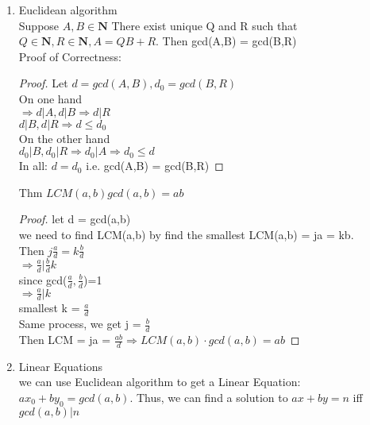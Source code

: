 \documentclass[10pt]{article}
\newcommand{\Nb}{\mathbf{N}}
\begin{document}
\begin{multicols}{2}
\begin{enumerate}
	\item Euclidean algorithm\\
	Suppose $A,B\in \Nb$ There exist unique Q and R such that $Q\in \Nb, R\in \Nb, A = QB+R$. Then gcd(A,B) = gcd(B,R)\\
	Proof of Correctness: 
	\begin{proof}
		Let $d = gcd(A,B), d_0 = gcd(B,R)$\\
		On one hand\\
		$\Rightarrow d|A, d|B \Rightarrow d|R$\\
		$d|B, d|R \Rightarrow d \le d_0$\\
		On the other hand\\
		$d_0|B, d_0|R \Rightarrow d_0 |A \Rightarrow d_0 \le d$\\
		In all: $d = d_0$ i.e. gcd(A,B) = gcd(B,R)
	\end{proof} 

    Thm $LCM(a,b)gcd(a,b) = ab$
	\begin{proof}
		let d = gcd(a,b)\\we need to find LCM(a,b) by find the smallest LCM(a,b) = ja = kb.\\
		Then $j\frac{a}{d} = k\frac{b}{d}$\\
		$\Rightarrow \frac{a}{d} | \frac{b}{d}k$\\
		since gcd($\frac{a}{d},\frac{b}{d}$)=1\\
		$\Rightarrow \frac{a}{d}|k$\\
		smallest k = $\frac{a}{d}$\\
		Same process, we get j = $\frac{b}{d}$\\
		Then LCM = ja = $\frac{ab}{d}\Rightarrow LCM(a,b) \cdot gcd(a,b) = ab$
	\end{proof}

	\item Linear Equations\\
	we can use Euclidean algorithm to get a Linear Equation: $ax_0 + by_0 = gcd(a,b)$. Thus, we can find a solution to $ax + by = n$ iff $gcd(a,b)|n$
	

\end{enumerate}
\end{multicols}
\end{document}
